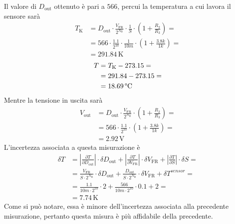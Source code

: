 \documentclass[a4paper]{article}
\newcommand\abs[1]{\left|#1\right|}
\begin{document}
			Il valore di $ D_{\mathrm{out}} $ ottenuto è pari a $ 566 $, percui la temperatura a cui lavora il sensore sarà
			\begin{equation*}
				\begin{split}
					T_{\mathrm{K}} &= D_{\mathrm{out}} \cdot \frac{V_{\mathrm{FR}}}{2^{N_{\mathrm{B}}}} \cdot \frac{1}{S} \cdot (1 + \frac{R_{2}}{R_{3}}) = \\
								   &= 566 \cdot \frac{1.1}{2^{10}} \cdot \frac{1}{10m} \cdot (1 + \frac{3.8k}{1k}) = \\
								   &= 291.84 \, \mathrm{K}
				\end{split}
			\end{equation*}
			\begin{equation*}
				\begin{split}
					T &= T_{\mathrm{K}} - 273.15 = \\
					  &= 291.84 - 273.15 = \\
					  &= 18.69 \, \mathrm{\text{\textdegree} C}
				\end{split}
			\end{equation*}
			Mentre la tensione in uscita sarà
			\begin{equation*}
				\begin{split}
					V_{\mathrm{out}} &= D_{\mathrm{out}} \cdot \frac{V_{\mathrm{FR}}}{2^{N_{\mathrm{B}}}} \cdot (1 + \frac{R_{2}}{R_{3}}) = \\
									 &= 566 \cdot \frac{1.1}{2^{10}} \cdot (1 + \frac{3.8k}{1k}) = \\
									 &= 2.92 \, \mathrm{V}
				\end{split}
			\end{equation*}
			L'incertezza associata a questa misurazione è
			\begin{equation*}
				\begin{split}
					\delta T &= \abs{\frac{\partial T}{\partial D_{\mathrm{out}}}} \cdot \delta D_{\mathrm{out}} + \abs{\frac{\partial T}{\partial V_{\mathrm{FR}}}} \cdot \delta V_{\mathrm{FR}} + \abs{\frac{\partial T}{\partial S}} \cdot \delta S = \\
							 &= \frac{V_{\mathrm{FR}}}{S \cdot 2^{N_{\mathrm{B}}}} \cdot \delta D_{\mathrm{out}} + \frac{D_{\mathrm{out}}}{S \cdot 2^{N_{\mathrm{B}}}} \cdot \delta V_{\mathrm{FR}} + \delta T^{sensor} = \\
							 &= \frac{1.1}{10m \cdot 2^{10}} \cdot 2 + \frac{566}{10m \cdot 2^{10}} \cdot 0.1 + 2 = \\
							 &= 7.74 \, \mathrm{K}
				\end{split}
			\end{equation*}
			Come si può notare, essa è minore dell'incertezza associata alla precedente misurazione, pertanto questa misura è più affidabile della precedente.
\end{document}
